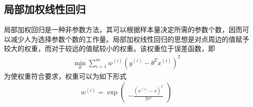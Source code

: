 \subsection{局部加权线性回归}
局部加权回归是一种非参数方法，其可以根据样本量决定所需的参数个数，因而可以减少人为选择参数个数的工作量。局部加权线性回归的思想是对点周边的值赋予较大的权重，而对于较远的值赋较小的权重。该权重位于误差函数，即
\begin{eqnarray}
\min_\theta \sum_{i=1}^mw^{(i)}(y^{(i)}-\theta^Tx^{(i)})^2
\end{eqnarray}
为使权重符合要求，权重可以为如下形式
\begin{eqnarray}
w^{(i)}=\exp
\left(
\begin{aligned}
-\frac{(x^{(i)}-x)^2}{2\tau^2}
\end{aligned}
\right)
\end{eqnarray}


